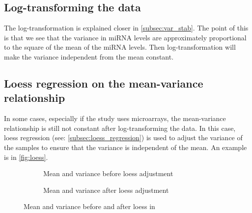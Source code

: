 \subsection{Log-transforming the data}
The log-transformation is explained closer in \autoref{subsec:var_stab}. The point of this is that we see that the variance in miRNA levels are approximately proportional to the square of the mean of the miRNA levels. Then log-transformation will make the variance independent from the mean constant.

\subsection{Loess regression on the mean-variance relationship}
In some cases, especially if the study uses microarrays, the mean-variance relationship is still not constant after log-transforming the data. In this case, loess regression (see: \autoref{subsec:loess_regression}) is used to adjust the variance of the samples to ensure that the variance is independent of the mean. An example is in \autoref{fig:loess}.

\begin{figure}
    \begin{subfigure}[b]{0.5\textwidth}
    \caption{Mean and variance before loess adjustment}
    \label{fig:loess_before}
    \end{subfigure}
    \begin{subfigure}[b]{0.5\textwidth}
    \caption{Mean and variance after loess adjustment}
    \label{fig:loess_before}
    \end{subfigure}
    \caption{Mean and variance before and after loess in \citet{Asakura2020}}
    \label{fig:loess}
\end{figure}



